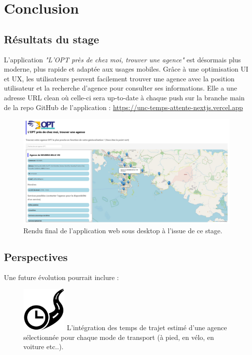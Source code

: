 \documentclass[12pt,a4paper]{report}
\begin{document}
\chapter{Conclusion}
\section{Résultats du stage}
L’application \textit{"L'OPT près de chez moi, trouver une agence"} est désormais plus moderne, plus rapide et adaptée aux usages mobiles. Grâce à une optimisation UI et UX, les utilisateurs peuvent facilement trouver une agence avec la position utilisateur et la recherche d'agence pour consulter ses informations. Elle a une adresse URL clean où celle-ci sera up-to-date à chaque push sur la branche main de la repo GitHub de l'application : \href{https://unc-temps-attente-nextjs.vercel.app}{https://unc-temps-attente-nextjs.vercel.app}
\begin{figure}[h] %
    \centering
    \includegraphics[width=1\textwidth]{ressources_rapport/app_opt.JPG}
    \caption{Rendu final de l'application web sous desktop à l'issue de ce stage.}
\end{figure}
\newpage

\section{Perspectives}
Une future évolution pourrait inclure :

\vspace{1cm}
\begin{figure}[h] %
    \centering
    \includegraphics[width=0.2\textwidth]{ressources_rapport/temps_trajet.png}
    L’intégration des temps de trajet estimé d'une agence sélectionnée pour chaque mode de transport (à pied, en vélo, en voiture etc..).
\end{figure}
\end{document}

